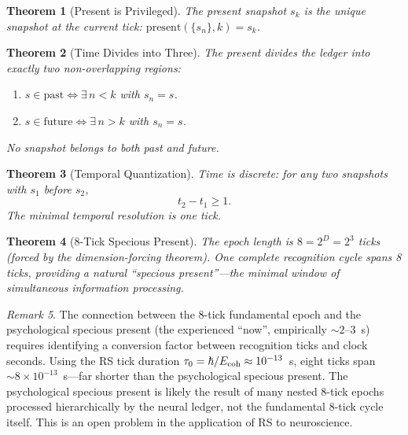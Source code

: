\documentclass[12pt,a4paper]{article}
\newtheorem{theorem}{Theorem}[section]
\theoremstyle{definition}
\theoremstyle{remark}
\newtheorem{remark}[theorem]{Remark}
\begin{document}
\begin{theorem}[Present is Privileged]
\label{thm:present}
The present snapshot $s_k$ is the unique snapshot at the current tick:
$\mathrm{present}(\{s_n\}, k) = s_k$.
\end{theorem}

\begin{theorem}[Time Divides into Three]
\label{thm:divide}
The present divides the ledger into exactly two non-overlapping regions:
\begin{enumerate}[label=(\roman*),nosep]
  \item $s \in \mathrm{past} \Leftrightarrow \exists\, n < k$ with
  $s_n = s$.
  \item $s \in \mathrm{future} \Leftrightarrow \exists\, n > k$ with
  $s_n = s$.
\end{enumerate}
No snapshot belongs to both past and future.
\end{theorem}

\begin{theorem}[Temporal Quantization]
\label{thm:quant}
Time is discrete: for any two snapshots with $s_1$ before $s_2$,
\begin{equation}
  t_2 - t_1 \geq 1.
\end{equation}
The minimal temporal resolution is one tick.
\end{theorem}

\begin{theorem}[8-Tick Specious Present]
\label{thm:specious}
The epoch length is $8 = 2^D = 2^3$ ticks (forced by the dimension-forcing
theorem).  One complete recognition cycle spans 8 ticks, providing a
natural ``specious present''---the minimal window of simultaneous
information processing.
\end{theorem}

\begin{remark}
The connection between the 8-tick fundamental epoch and the
psychological specious present (the experienced ``now'', empirically
$\sim 2$--$3$~s) requires identifying a conversion factor between
recognition ticks and clock seconds.  Using the RS tick duration
$\tau_0 = \hbar/E_{\rm coh} \approx 10^{-13}$~s, eight ticks span
$\sim 8 \times 10^{-13}$~s---far shorter than the psychological specious
present.  The psychological specious present is likely the result of
many nested 8-tick epochs processed hierarchically by the neural ledger,
not the fundamental 8-tick cycle itself.  This is an open problem in
the application of RS to neuroscience.
\end{remark}
\end{document}
